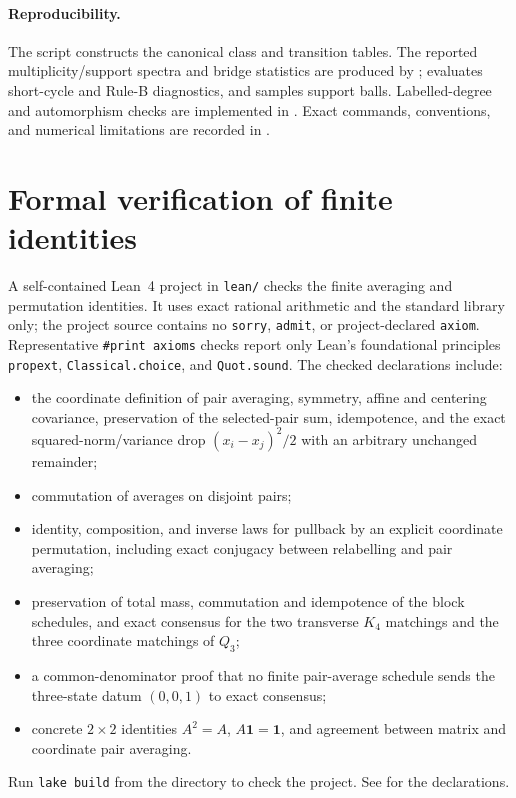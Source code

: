 \documentclass[11pt]{article}
\newcommand{\one}{\mathbf 1}
\theoremstyle{definition}
\begin{document}
\paragraph{Reproducibility.}
The script  constructs the canonical class and
transition tables.  The reported multiplicity/support spectra and bridge
statistics are produced by ;
 evaluates short-cycle and Rule-B
diagnostics, and  samples support balls.
Labelled-degree and automorphism checks are implemented in
.  Exact commands, conventions, and
numerical limitations are recorded in .

\section{Formal verification of finite identities}

A self-contained Lean~4 project in \texttt{lean/} checks the finite
averaging and permutation identities. It uses exact rational arithmetic
and the standard library only; the project source contains no \texttt{sorry},
\texttt{admit}, or project-declared \texttt{axiom}.  Representative
\texttt{\#print axioms} checks report only Lean's foundational principles
\texttt{propext}, \texttt{Classical.choice}, and \texttt{Quot.sound}.  The
checked declarations include:
\begin{itemize}[leftmargin=*]
    \item the coordinate definition of pair averaging, symmetry, affine and
    centering covariance, preservation of the selected-pair sum, idempotence,
    and the exact squared-norm/variance drop $(x_i-x_j)^2/2$ with an arbitrary
    unchanged remainder;
    \item commutation of averages on disjoint pairs;
    \item identity, composition, and inverse laws for pullback by an explicit
    coordinate permutation, including exact conjugacy between relabelling and
    pair averaging;
    \item preservation of total mass, commutation and idempotence of the block
    schedules, and exact consensus for the two transverse $K_4$ matchings and
    the three coordinate matchings of $Q_3$;
    \item a common-denominator proof that no finite pair-average schedule sends
    the three-state datum $(0,0,1)$ to exact consensus;
    \item concrete $2\times2$ identities $A^2=A$, $A\one=\one$, and agreement
    between matrix and coordinate pair averaging.
\end{itemize}
Run \texttt{lake build} from the  directory to check the project.
See  for the declarations.
\end{document}
